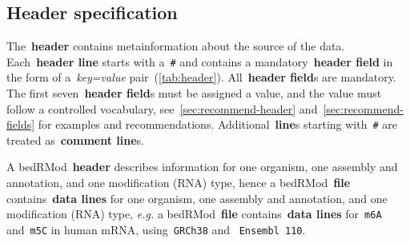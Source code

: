 \documentclass[11pt]{article}
\begin{document}
\subsection{Header specification}\label{sec:header}

The~\textbf{header} contains metainformation about the source of the data. Each~\textbf{header line} starts with a~\texttt{\#} and contains a
mandatory~\textbf{header field} in the form of a~\emph{key=value} pair~(\autoref{tab:header}). All~\textbf{header field}s are mandatory. The first seven~\textbf{header field}s must be assigned a value, and the value must follow a controlled vocabulary, see~\autoref{sec:recommend-header} and~\ref{sec:recommend-fields} for examples and recommendations. Additional~\textbf{line}s starting with~\texttt{\#} are treated as~\textbf{comment line}s.

A \ac{bedRMod}~\textbf{header} describes information for one organism, one assembly and annotation, and one modification (RNA) type, hence a \ac{bedRMod}~\textbf{file} contains~\textbf{data lines} for one organism, one assembly and annotation, and one modification (RNA) type, \textit{e.g.} a \ac{bedRMod}~\textbf{file} contains~\textbf{data lines} for~\texttt{m6A} and~\texttt{m5C} in human mRNA, using~\texttt{GRCh38} and ~\texttt{Ensembl 110}.
\end{document}
